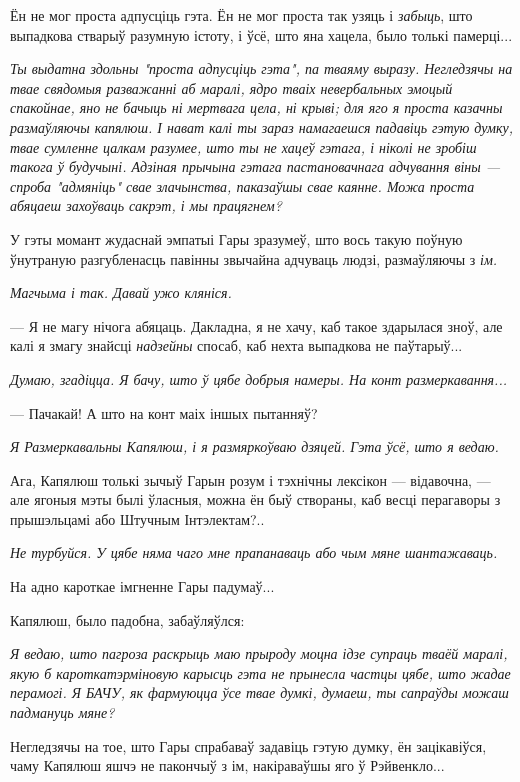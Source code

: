 Ён не мог проста адпусціць гэта. Ён не мог проста так узяць і \emph{забыць}, што выпадкова стварыў разумную 
істоту, і ўсё, што яна хацела, было толькі памерці...

\emph{Ты выдатна здольны "проста адпусціць гэта", па тваяму выразу. 
Негледзячы на твае свядомыя разважанні аб маралі, ядро тваіх невербальных
эмоцый спакойнае, яно не бачыць ні мертвага цела, ні крыві; для яго я проста 
казачны размаўляючы капялюш. І нават калі ты зараз намагаешся 
падавіць гэтую думку, твае сумленне цалкам разумее, што ты не хацеў гэтага,
і ніколі не зробіш такога ў будучыні. Адзіная прычына гэтага пастановачнага 
адчування віны --- спроба "адмяніць" свае злачынства, паказаўшы свае каянне.
Можа проста абяцаеш захоўваць сакрэт, і мы працягнем?}

У гэты момант жудаснай эмпатыі Гары зразумеў, што вось такую поўную ўнутраную 
разгубленасць павінны звычайна адчуваць людзі, размаўляючы з  \emph{ім.}


\emph{Магчыма і так. Давай ужо кляніся.} 

--- Я не магу нічога абяцаць. Дакладна, я не хачу, каб такое здарылася зноў, але 
калі я змагу знайсці \emph{надзейны} спосаб, каб нехта выпадкова не паўтарыў...

\emph{Думаю, згадіцца. Я бачу, што ў цябе добрыя намеры. На конт размеркавання...}

--- Пачакай! А што на конт маіх іншых пытанняў?

\emph{Я Размеркавальны Капялюш, і я размяркоўваю дзяцей. Гэта ўсё, што я ведаю.}

Ага, Капялюш толькі зычыў Гарын розум і тэхнічны лексікон --- відавочна, --- 
але ягоныя мэты былі ўласныя, можна ён быў створаны, каб весці перагаворы з 
прышэльцамі або Штучным Інтэлектам?.. 

\emph{Не турбуйся. У цябе няма чаго мне прапанаваць або чым мяне шантажаваць.}

На адно кароткае імгненне Гары падумаў...

Капялюш, было падобна, забаўляўлся:

\emph{Я ведаю, што пагроза раскрыць маю прыроду моцна ідзе супраць тваёй маралі,
якую б кароткатэрміновую карысць гэта не прынесла частцы цябе, што жадае перамогі.
Я БАЧУ, як фармуюцца ўсе твае думкі, думаеш, ты сапраўды можаш падмануць мяне?}

Негледзячы на тое, што Гары спрабаваў задавіць гэтую думку, ён зацікавіўся, чаму
Капялюш яшчэ не пакончыў з ім, накіраваўшы яго ў Рэйвенкло...

